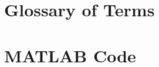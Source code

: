 
\newpage



\clearpage

\begin{appendices}
	
	\setlength{\glspagelistwidth}{\textwidth}
	\setlength{\glsdescwidth}{0.85\textwidth}

	\renewcommand*{\arraystretch}{1.2}	%
	
		
	\chapter{Glossary of Terms}	\label{cha:Glossary_of_Terms}
	
	\printglossary[type=terminology,style=altlist]
	
	\chapter{MATLAB Code} \label{cha:MatLab_Code}
	

\end{appendices}
